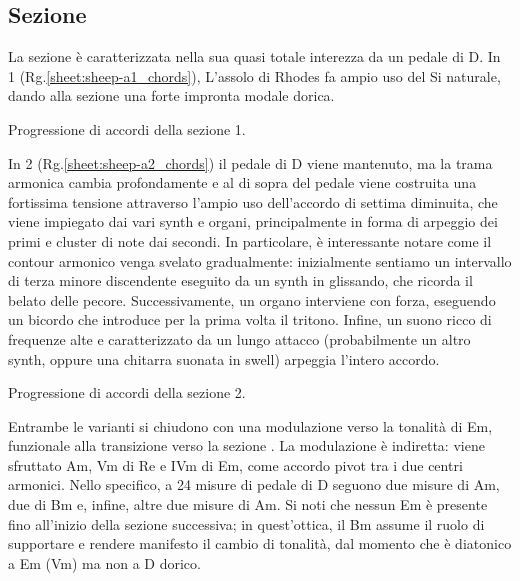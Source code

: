 \documentclass[class=book, crop=false, oneside, 12pt]{standalone}
\begin{document}
    \subsection{Sezione }
    La sezione  è caratterizzata nella sua quasi totale interezza da un pedale di D. In 1 (Rg.\ref{sheet:sheep-a1_chords}), L'assolo di Rhodes fa ampio uso del Si naturale, dando alla sezione una forte impronta modale dorica.     
    
    \begin{sheet}[htb]
        \centering
        \caption{Progressione di accordi della sezione 1.}
        \label{sheet:sheep-a1_chords}
    \end{sheet}

    In 2 (Rg.\ref{sheet:sheep-a2_chords}) il pedale di D viene mantenuto, ma la trama armonica cambia profondamente e al di sopra del pedale viene costruita una fortissima tensione attraverso l'ampio uso dell'accordo di settima diminuita, che viene impiegato dai vari synth e organi, principalmente in forma di arpeggio dei primi e cluster di note dai secondi. In particolare, è interessante notare come il contour armonico venga svelato gradualmente: inizialmente sentiamo un intervallo di terza minore discendente eseguito da un synth in glissando, che ricorda il belato delle pecore.
    Successivamente, un organo interviene con forza, eseguendo un bicordo che introduce per la prima volta il tritono. Infine, un suono ricco di frequenze alte e caratterizzato da un lungo attacco (probabilmente un altro synth, oppure una chitarra suonata in swell) arpeggia l'intero accordo. 
    
    \begin{sheet}[htb]
        \centering
        \caption{Progressione di accordi della sezione 2.}
        \label{sheet:sheep-a2_chords}
    \end{sheet}

    Entrambe le varianti si chiudono con una modulazione verso la tonalità di Em, funzionale alla transizione verso la sezione . La modulazione è indiretta: viene sfruttato Am, Vm di Re e IVm di Em,  come accordo pivot tra i due centri armonici. Nello specifico, a 24 misure di pedale di D seguono due misure di Am, due di Bm e, infine, altre due misure di Am. Si noti che nessun Em è presente fino all'inizio della sezione successiva; in quest'ottica,  il Bm assume il ruolo di supportare e rendere manifesto il cambio di tonalità, dal momento che è diatonico a Em (Vm) ma non a D dorico. 
\end{document}
